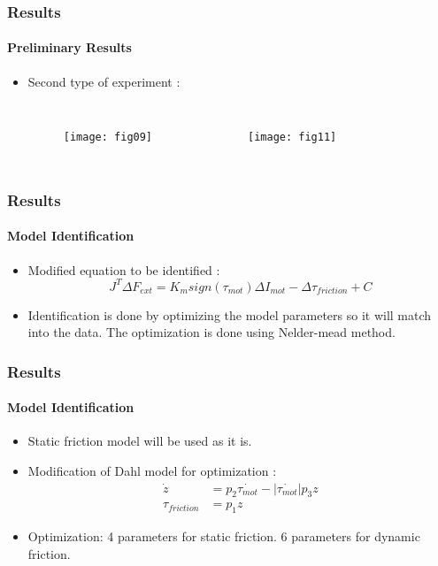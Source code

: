 \documentclass[12pt,english]{beamer}
\begin{document}
  \begin{frame}
    \frametitle{Results}
    \framesubtitle{Preliminary Results}
    \begin{itemize}
      \item Second type of experiment :
      \begin{columns}
        \begin{figure}
          \texttt{[image: fig09]} \,
        \end{figure}
        \begin{figure}
          \texttt{[image: fig11]} \,
        \end{figure}
      \end{columns}
    \end{itemize}
  \end{frame}
  
  \begin{frame}
    \frametitle{Results}
    \framesubtitle{Model Identification}
    \begin{itemize}
    \item Modified equation to be identified :
    \begin{equation}
      J^{T} \Delta F_{ext} = K_{m} sign\left(\tau_{mot}\right) \Delta I_{mot} - \Delta \tau_{friction} + C
    \end{equation}
    \item Identification is done by optimizing the model parameters so it will match into the data. The optimization is done using Nelder-mead method.
    \end{itemize}
  \end{frame}
  
  \begin{frame}
    \frametitle{Results}
    \framesubtitle{Model Identification}
    \begin{itemize}
    \item Static friction model will be used as it is.
    \item Modification of Dahl model for optimization :
    \begin{align}
      \dot{z} &= p_{2 }\dot{\tau_{mot}} - \left|\dot{\tau_{mot}}\right| p_{3} z \\
      \tau_{friction} &= p_{1} z
    \end{align}
    \item Optimization: 4 parameters for static friction. 6 parameters for dynamic friction.
    \end{itemize}
  \end{frame}
  
\end{document}
